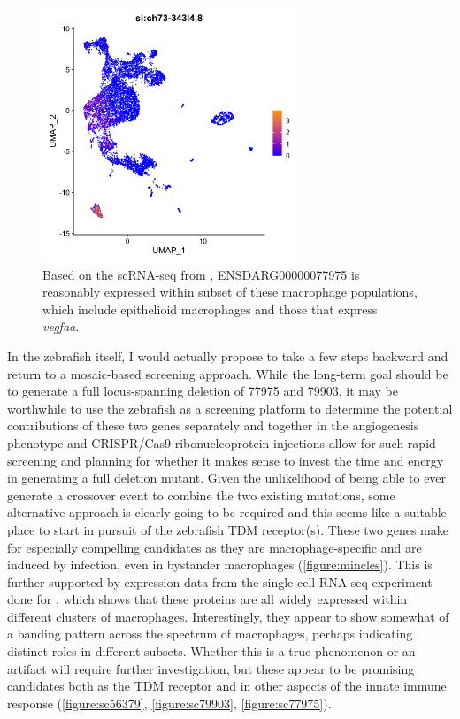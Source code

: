 \begin{figure}
\centering
\includegraphics[height=3in]{images/wtCombo_si:ch73-343l4.8_GEPlot.png
}
\caption[Single\hyp{}cell RNA\hyp{}seq expression profile for 77975]{Based on the scRNA\hyp{}seq from \citet{Cronan2021}, ENSDARG00000077975 is reasonably expressed within subset of these macrophage populations, which include epithelioid macrophages and those that express \textit{vegfaa}.}
\label{figure:sc77975}
\end{figure}

In the zebrafish itself, I would actually propose to take a few steps backward and return to a mosaic\hyp{}based screening approach. While the long\hyp{}term goal should be to generate a full locus\hyp{}spanning deletion of 77975 and 79903, it may be worthwhile to use the zebrafish as a screening platform to determine the potential contributions of these two genes separately and together in the angiogenesis phenotype and CRISPR/Cas9 ribonucleoprotein injections allow for such rapid screening and planning for whether it makes sense to invest the time and energy in generating a full deletion mutant. Given the unlikelihood of being able to ever generate a crossover event to combine the two existing mutations, some alternative approach is clearly going to be required and this seems like a suitable place to start in pursuit of the zebrafish TDM receptor(s). These two genes make for especially compelling candidates as they are macrophage\hyp{}specific and are induced by infection, even in bystander macrophages (\autoref{figure:mincles}). This is further supported by expression data from the single cell RNA\hyp{}seq experiment done for \citet{Cronan2021}, which shows that these proteins are all widely expressed within different clusters of macrophages. Interestingly, they appear to show somewhat of a banding pattern across the spectrum of macrophages, perhaps indicating distinct roles in different subsets. Whether this is a true phenomenon or an artifact will require further investigation, but these appear to be promising candidates both as the TDM receptor and in other aspects of the innate immune response (\autoref{figure:sc56379}, \autoref{figure:sc79903}, \autoref{figure:sc77975}). 


